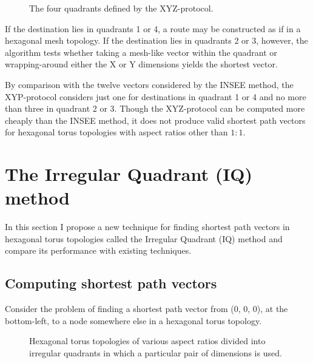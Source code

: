 				\begin{figure}
					\center
					
					\caption{The four quadrants defined by the XYZ-protocol.}
					\label{fig:xyz-protocol-regions}
				\end{figure}
				
				If the destination lies in quadrants 1 or 4, a route may be constructed
				as if in a hexagonal mesh topology. If the destination lies in
				quadrants 2 or 3, however, the algorithm tests whether taking a
				mesh-like vector within the quadrant or wrapping-around either the X or
				Y dimensions yields the shortest vector.
				
				By comparison with the twelve vectors considered by the INSEE method,
				the XYP-protocol considers just one for destinations in quadrant 1 or 4
				and no more than three in quadrant 2 or 3. Though the XYZ-protocol can
				be computed more cheaply than the INSEE method, it does not produce
				valid shortest path vectors for hexagonal torus topologies with aspect
				ratios other than $1:1$.
		
	\section{The Irregular Quadrant (IQ) method}
		
		In this section I propose a new technique for finding shortest path vectors
		in hexagonal torus topologies called the Irregular Quadrant (IQ) method and
		compare its performance with existing techniques.
		
		\subsection{Computing shortest path vectors}
		
			Consider the problem of finding a shortest path vector from (0, 0, 0), at
			the bottom-left, to a node somewhere else in a hexagonal torus topology.
			
			\begin{figure}
				\center
				
				\caption[The four irregular quadrants defined by the IQ method.]%
				{Hexagonal torus topologies of various aspect ratios divided
				into irregular quadrants in which a particular pair of dimensions is used.}
				\label{fig:shortest-path-regions}
			\end{figure}
			
